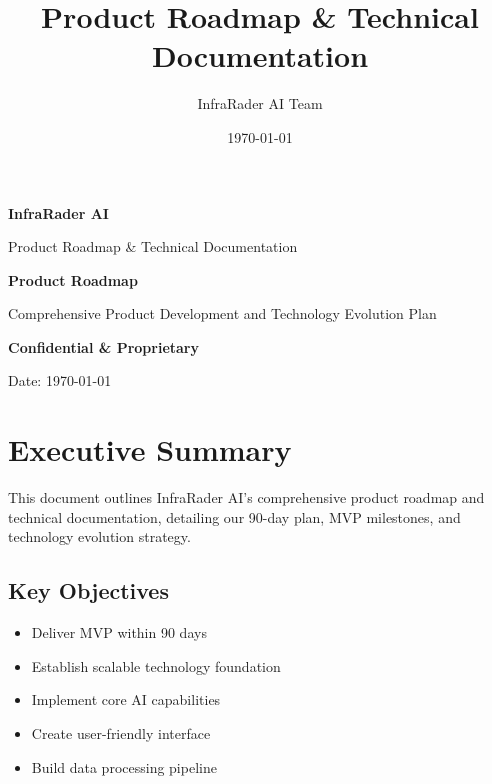 \documentclass[business]{../templates/infraradar-main}
\title{Product Roadmap \& Technical Documentation}
\author{InfraRader AI Team}
\date{\today}
\begin{document}
\begin{titlepage}
    \centering
    \vspace*{2cm}
    
    {\Huge\bfseries\color{infraradar@primary} InfraRader AI\par}
    \vspace{0.5cm}
    {\Large\color{infraradar@text} Product Roadmap \& Technical Documentation\par}
    \vspace{2cm}
    
    {\huge\bfseries Product Roadmap\par}
    \vspace{1cm}
    
    {\large Comprehensive Product Development and Technology Evolution Plan\par}
    \vspace{2cm}
    
    {\large\bfseries\color{infraradar@primary} Confidential \& Proprietary\par}
    {\large Date: \today\par}
    
\end{titlepage}

\tableofcontents
\newpage

\section{Executive Summary}

This document outlines InfraRader AI's comprehensive product roadmap and technical documentation, detailing our 90-day plan, MVP milestones, and technology evolution strategy.

\subsection{Key Objectives}
\begin{itemize}
    \item Deliver MVP within 90 days
    \item Establish scalable technology foundation
    \item Implement core AI capabilities
    \item Create user-friendly interface
    \item Build data processing pipeline
\end{itemize}
\end{document}
